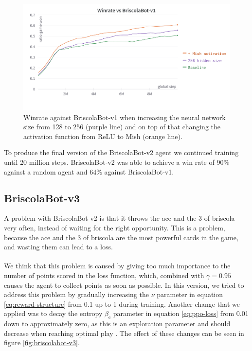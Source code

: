 \begin{figure}[H]
    \centering
    \includegraphics[width=\textwidth]{images/mish-activation.png}
    \caption{Winrate against BriscolaBot-v1 when increasing the neural network size from 128 to 256 (purple line) and on top of that changing the activation function from ReLU to Mish (orange line).}
    \label{fig:mish-activation}
\end{figure}

To produce the final version of the BriscolaBot-v2 agent we continued training until 20 million steps. BriscolaBot-v2 was able to achieve a win rate of 90\% against a random agent and 64\% against BriscolaBot-v1.

\subsection{BriscolaBot-v3}
A problem with BriscolaBot-v2 is that it throws the ace and the 3 of briscola very often, instead of waiting for the right opportunity. This is a problem, because the ace and the 3 of briscola are the most powerful cards in the game, and wasting them can lead to a loss.\\\\
We think that this problem is caused by giving too much importance to the number of points scored in the loss function, which, combined with $\gamma = 0.95$ causes the agent to collect points as soon as possible. In this version, we tried to address this problem by gradually increasing the $\nu$ parameter in equation \eqref{eq:reward-structure} from 0.1 up to 1 during training. Another change that we applied was to decay the entropy $\beta_\textrm{e}$ parameter in equation \eqref{eq:ppo-loss} from 0.01 down to approximately zero, as this is an exploration parameter and should decrease when reaching optimal play \cite{open-ai-five}. The effect of these changes can be seen in figure \ref{fig:briscolabot-v3}.

